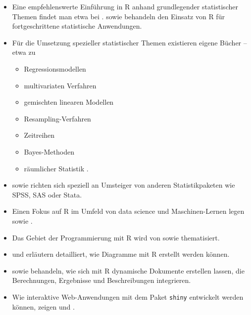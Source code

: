 \begin{itemize}
\item Eine empfehlenswerte Einführung in R anhand grundlegender statistischer Themen findet man etwa bei .  sowie  behandeln den Einsatz von R für fortgeschrittene statistische Anwendungen.
\item Für die Umsetzung spezieller statistischer Themen existieren eigene Bücher -- etwa zu
\begin{itemize}
\item Regressionsmodellen \cite{Fox2002,HarrellJr2001}
\item multivariaten Verfahren \cite{Zelterman2015}
\item gemischten linearen Modellen \cite{Galecki2013,Pinheiro2000,West2006}
\item Resampling-Verfahren \cite{Chernik2011,Chihara2011}
\item Zeitreihen \cite{Shumway2006,Hyndman2019}
\item Bayes-Methoden \cite{Kruschke2015,McElreath2015}
\item räumlicher Statistik \cite{Bivand2013}.
\end{itemize}
\item {} sowie  richten sich speziell an Umsteiger von anderen Statistikpaketen wie SPSS, SAS oder Stata.
\item Einen Fokus auf R im Umfeld von data science und Maschinen-Lernen legen  sowie .
\item Das Gebiet der Programmierung mit R wird von  sowie  thematisiert.
\item {} und  erläutern detailliert, wie Diagramme mit R erstellt werden können.
\item {} sowie  behandeln, wie sich mit R dynamische Dokumente erstellen lassen, die Berechnungen, Ergebnisse und Beschreibungen integrieren.
\item Wie interaktive Web-Anwendungen mit dem Paket \lstinline!shiny! \cite{RStudioShiny2014} entwickelt werden können, zeigen  und .
\end{itemize}

